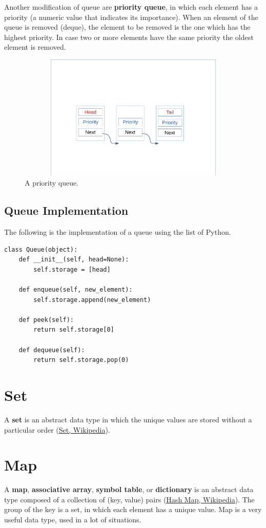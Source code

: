 Another modification of queue are \textbf{priority queue}, in which each element has a priority (a numeric value that indicates its importance). When an element of the queue is removed (deque), the element to be removed is the one which has the highest priority. In case two or more elements have the same priority the oldest element is removed.

\begin{figure}[h]
	\includegraphics[width=14cm,height=6cm]{chapters/datastructures/images/queue_3.pdf}
	\caption[]{A priority queue.}
	\label{queue_3}
\end{figure}

\subsection{Queue Implementation}
The following is the implementation of a queue using the list of Python.
\begin{lstlisting}[caption={Queue implementation.}]
class Queue(object):
	def __init__(self, head=None):
		self.storage = [head]
	
	def enqueue(self, new_element):
		self.storage.append(new_element)
	
	def peek(self):
		return self.storage[0]
	
	def dequeue(self):
		return self.storage.pop(0)
\end{lstlisting}

\section{Set}
A \textbf{set} is an abstract data type in which the unique values are stored without a particular order \cite{wikiset} (\href{https://en.wikipedia.org/wiki/Set_(abstract_data_type)}{Set, Wikipedia}).

\section{Map}
A \textbf{map}, \textbf{associative array}, \textbf{symbol table}, or \textbf{dictionary} is an abstract data type composed of a collection of (key, value) pairs \cite{wikihashmap} (\href{https://en.wikipedia.org/wiki/Associative_array}{Hash Map, Wikipedia}). The group of the key is a set, in which each element has a unique value. Map is a very useful data type, used in a lot of situations. 

